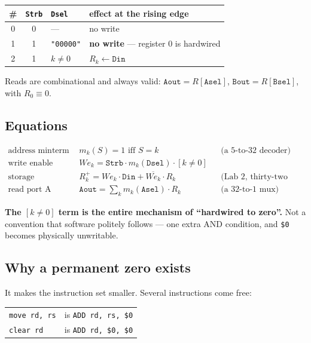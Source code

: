 \documentclass[11pt]{article}
\newcommand{\code}[1]{\texttt{#1}}
\begin{document}
\begin{center}
\begin{tabular}{ccl@{\hskip 8pt}||@{\hskip 8pt}l}
\toprule
\# & \code{Strb} & \code{Dsel} & effect at the rising edge \\
\midrule
0 & 0 & --- & no write \\
1 & 1 & \code{"00000"} & \textbf{no write} --- register 0 is hardwired \\
2 & 1 & $k \neq 0$ & $R_k \leftarrow \code{Din}$ \\
\bottomrule
\end{tabular}
\end{center}

Reads are combinational and always valid:
$\code{Aout} = R[\code{Asel}]$, $\code{Bout} = R[\code{Bsel}]$, with
$R_0 \equiv 0$.

\subsection*{Equations}

\begin{align*}
\text{address minterm} \quad & m_k(S) = 1 \text{ iff } S = k
  && \text{(a 5-to-32 decoder)}\\
\text{write enable} \quad & \mathit{We}_k = \code{Strb} \cdot m_k(\code{Dsel}) \cdot [k \neq 0] \\
\text{storage} \quad & R_k^{+} = \mathit{We}_k \cdot \code{Din} + \overline{\mathit{We}_k} \cdot R_k
  && \text{(Lab 2, thirty-two times)}\\
\text{read port A} \quad & \code{Aout} = \sum_{k} m_k(\code{Asel}) \cdot R_k
  && \text{(a 32-to-1 mux)}
\end{align*}

\textbf{The $[k \neq 0]$ term is the entire mechanism of ``hardwired to zero''.}
Not a convention that software politely follows --- one extra AND condition, and
\code{\$0} becomes physically unwritable.

\subsection*{Why a permanent zero exists}

It makes the instruction set smaller. Several instructions come free:

\begin{center}
\begin{tabular}{ll}
\toprule
\code{move rd, rs} & is \code{ADD rd, rs, \$0} \\
\code{clear rd} & is \code{ADD rd, \$0, \$0} \\
\bottomrule
\end{tabular}
\end{center}
\end{document}
